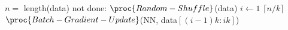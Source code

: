\documentclass[10pt,oneside]{book}
\begin{document}
\pagestyle{empty}
\thispagestyle{empty}

\begin{codebox}
  \li     $n = $ length(data)
  \li     \While not done:
        \Do
  \li        $\proc{Random-Shuffle}$(data)
  \li        \For $i \gets 1$ \To $\lceil n/k \rceil$
           \Do
  \li           $\proc{Batch-Gradient-Update}$(NN, data$[(i - 1)k:ik]$)
           \End
	\End
\end{codebox}
\end{document}
